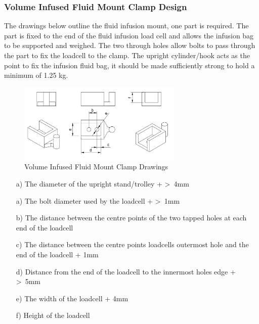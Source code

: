\subsubsection{Volume Infused Fluid Mount Clamp Design}

The drawings below outline the fluid infusion mount, one part is required. The part is fixed to the end of the fluid infusion load cell and allows the infusion bag to be supported and weighed.
The two through holes allow bolts to pass through the part to fix the loadcell to the clamp. The upright cylinder/hook acts as the point to fix the infusion fluid bag, it should be made sufficiently strong to hold a minimum of 1.25 kg.


\begin{figure}[h]
    \centering
    \includegraphics[width=0.7\textwidth]{Figures/SupportDrawings/vi_fluid_bag_mount_drawing.png}
    \caption{Volume Infused Fluid Mount Clamp Drawings}
    \label{fig:vimountclampdrawing}
  \end{figure}


  \begin{enumerate}
    \item[a)] The diameter of the upright stand/trolley + \textgreater\ 4mm
    \item[a)]	The bolt diameter used by the loadcell + \textgreater\ 1mm
    \item[b)]	The distance between the centre points of the two tapped holes at each end of the loadcell
    \item[c)]	The distance between the centre points loadcells outermost hole and the end of the loadcell + 1mm
    \item[d)]	Distance from the end of the loadcell to the innermost holes edge + \textgreater\ 5mm
    \item[e)]	The width of the loadcell + 4mm
    \item[f)]	Height of the loadcell

  \end{enumerate}

